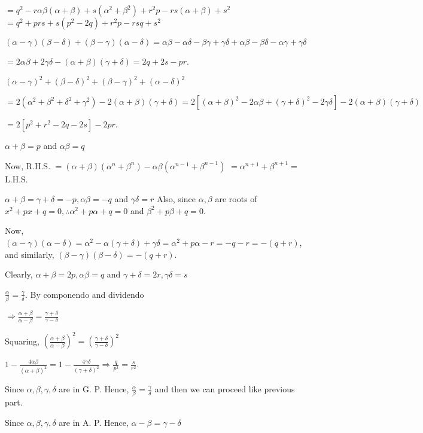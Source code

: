     $= q^2 - r\alpha\beta(\alpha + \beta) + s(\alpha^2 + \beta^2) + r^2p - rs(\alpha + \beta) + s^2$
    $= q^2 + prs + s(p^2 - 2q) + r^2p - rsq + s^2$
  \item $(\alpha - \gamma)(\beta - \delta) + (\beta - \gamma)(\alpha - \delta) = \alpha\beta -
    \alpha\delta - \beta\gamma + \gamma\delta + \alpha\beta - \beta\delta -\alpha\gamma + \gamma\delta$

    $= 2\alpha\beta + 2\gamma\delta - (\alpha + \beta)(\gamma + \delta) = 2q + 2s - pr$.
  \item $(\alpha - \gamma)^2 + (\beta - \delta)^2 + (\beta - \gamma)^2 + (\alpha - \delta)^2$

    $= 2(\alpha^2 + \beta^2 + \delta^2 + \gamma^2) - 2(\alpha + \beta)(\gamma + \delta) = 2[(\alpha +
    \beta)^2 - 2\alpha\beta + (\gamma + \delta)^2 - 2\gamma\delta] - 2(\alpha + \beta)(\gamma + \delta)$

    $= 2[p^2 + r^2 - 2q - 2s] - 2pr$.
  \stopitemize
\item $\alpha + \beta = p$ and $\alpha\beta = q$

  Now, R.H.S. $= (\alpha + \beta)(\alpha^n + \beta^n) - \alpha\beta(\alpha^{n - 1} + \beta^{n - 1})$ $=
  \alpha^{n + 1} + \beta^{n + 1} =$ L.H.S.
\item $\alpha + \beta = \gamma + \delta = -p, \alpha\beta = -q$ and $\gamma\delta = r$ Also, since $\alpha,
  \beta$ are roots of $x^2 + px + q = 0, \therefore \alpha^2 + p\alpha + q = 0$ and $\beta^2 + p\beta + q =
  0$.

  Now, $(\alpha - \gamma)(\alpha - \delta) = \alpha^2 - \alpha(\gamma + \delta) + \gamma\delta = \alpha^2 +
  p\alpha - r = -q - r = -(q + r)$, and similarly, $(\beta - \gamma)(\beta - \delta) = -(q + r)$.
\item Clearly, $\alpha + \beta = 2p, \alpha\beta = q$ and $\gamma + \delta = 2r, \gamma\delta = s$
  \startitemize[i]
  \item $\frac{\alpha}{\beta} = \frac{\gamma}{\delta}$. By componendo and dividendo

    $\Rightarrow \frac{\alpha + \beta}{\alpha - \beta} = \frac{\gamma + \delta}{\gamma - \delta}$

    Squaring, $\left(\frac{\alpha + \beta}{\alpha - \beta}\right)^2 = \left(\frac{\gamma + \delta}{\gamma
      - \delta}\right)^2$

    $1 - \frac{4\alpha\beta}{(\alpha + \beta)^2} = 1 - \frac{4\gamma\delta}{(\gamma + \delta)^2}\Rightarrow
    \frac{q}{p^2} = \frac{s}{r^2}$.
  \item Since $\alpha, \beta, \gamma, \delta$ are in G. P. Hence, $\frac{\alpha}{\beta} = \frac{\gamma}{\delta}$ and
    then we can proceed like previous part.
  \item Since $\alpha, \beta, \gamma, \delta$ are in A. P. Hence, $\alpha - \beta = \gamma - \delta$

